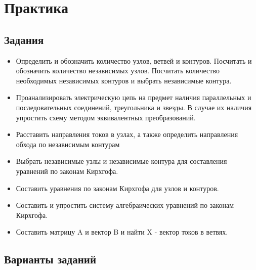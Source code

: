 \section{Практика}
\subsection{Задания}
\begin{itemize}
    \item Определить и обозначить количество узлов, ветвей и контуров. Посчитать и обозначить количество независимых узлов. Посчитать количество необходимых независимых контуров и выбрать независимые контура.
    \item Проанализировать электрическую цепь на предмет наличия параллельных и последовательных соединений, треугольника и звезды. В случае их наличия упростить схему методом эквивалентных преобразований. 
    \item Расставить направления токов в узлах, а также определить направления обхода по независимым контурам
    \item Выбрать независимые узлы и независимые контура для составления уравнений по законам Кирхгофа.
    \item  Составить уравнения по законам Кирхгофа для узлов и контуров.
    \item Составить и упростить систему алгебраических уравнений по законам Кирхгофа.
    \item Составить матрицу A и вектор B и найти X - вектор токов в ветвях.
\end{itemize}


\subsection{Варианты заданий}


